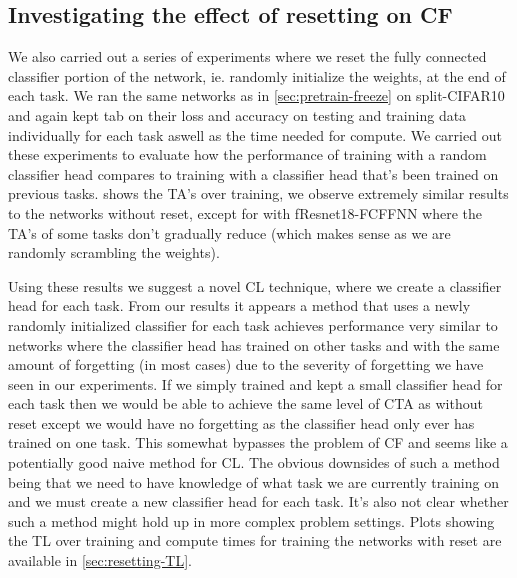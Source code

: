 \FloatBarrier
\subsection{Investigating the effect of resetting on CF}
\label{sec:resetting}
We also carried out a series of experiments where we reset the fully connected classifier portion of the network, ie. randomly initialize the weights, at the end of each task. We ran the same networks as in \cref{sec:pretrain-freeze} on split-CIFAR10 and again kept tab on their loss and accuracy on testing and training data individually for each task aswell as the time needed for compute. We carried out these experiments to evaluate how the performance of training with a random classifier head compares to training with a classifier head that's been trained on previous tasks.  shows the TA's over training, we observe extremely similar results to the networks without reset, except for with fResnet18-FCFFNN where the TA's of some tasks don't gradually reduce (which makes sense as we are randomly scrambling the weights). 

Using these results we suggest a novel CL technique, where we create a classifier head for each task. From our results it appears a method that uses a newly randomly initialized classifier for each task achieves performance very similar to networks where the classifier head has trained on other tasks and with the same amount of forgetting (in most cases) due to the severity of forgetting we have seen in our experiments. If we simply trained and kept a small classifier head for each task then we would be able to achieve the same level of CTA as without reset except we would have no forgetting as the classifier head only ever has trained on one task. This somewhat bypasses the problem of CF and seems like a potentially good naive method for CL. The obvious downsides of such a method being that we need to have knowledge of what task we are currently training on and we must create a new classifier head for each task. It's also not clear whether such a method might hold up in more complex problem settings. Plots showing the TL over training and compute times for training the networks with reset are available in \cref{sec:resetting-TL}.

